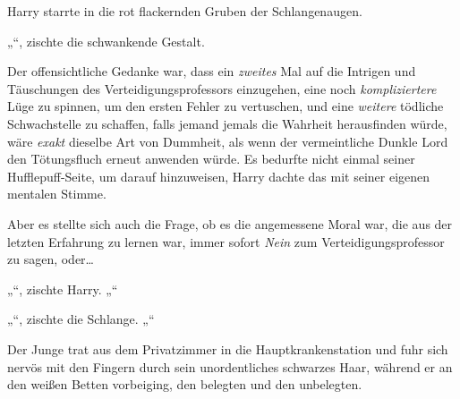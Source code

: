 Harry starrte in die rot flackernden Gruben der Schlangenaugen.

„“, zischte die schwankende Gestalt.

Der offensichtliche Gedanke war, dass ein \emph{zweites} Mal auf die Intrigen und Täuschungen des Verteidigungsprofessors einzugehen, eine noch \emph{kompliziertere} Lüge zu spinnen, um den ersten Fehler zu vertuschen, und eine \emph{weitere} tödliche Schwachstelle zu schaffen, falls jemand jemals die Wahrheit herausfinden würde, wäre \emph{exakt} dieselbe Art von Dummheit, als wenn der vermeintliche Dunkle Lord den Tötungsfluch erneut anwenden würde. Es bedurfte nicht einmal seiner Hufflepuff-Seite, um darauf hinzuweisen, Harry dachte das mit seiner eigenen mentalen Stimme.

Aber es stellte sich auch die Frage, ob es die angemessene Moral war, die aus der letzten Erfahrung zu lernen war, immer sofort \emph{Nein} zum Verteidigungsprofessor zu sagen, oder…

„“, zischte Harry. „“

„“, zischte die Schlange. „“

\later

Der Junge trat aus dem Privatzimmer in die Hauptkrankenstation und fuhr sich nervös mit den Fingern durch sein unordentliches schwarzes Haar, während er an den weißen Betten vorbeiging, den belegten und den unbelegten.

